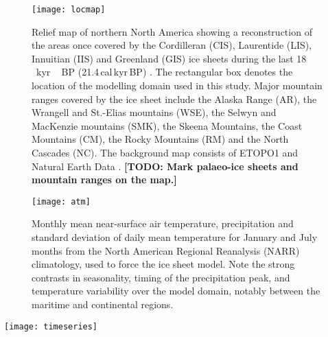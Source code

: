 \documentclass[tc, manuscript]{copernicus}
\newcommand{\todo}[1]{\textbf{[TODO: #1]}}
\begin{document}
\begin{figure}
  \texttt{[image: locmap]}
  \caption{Relief map of northern North America showing a reconstruction of the
           areas once covered by the Cordilleran (CIS), Laurentide (LIS),
           Innuitian (IIS) and Greenland (GIS) ice sheets during the last
           18\,\unit{\,kyr\,BP} (21.4\,cal\,kyr\,BP)
           \citep{Dyke.2004}. The rectangular box denotes the location of the
           modelling domain used in this study. Major mountain ranges covered
           by the ice sheet include the Alaska Range (AR), the Wrangell and
           St.-Elias mountains (WSE), the Selwyn and MacKenzie mountains (SMK),
           the Skeena Mountains, the Coast Mountains (CM), the Rocky Mountains
           (RM) and the North Cascades (NC). The background
           map consists of ETOPO1 \citep{Amante.Eakins.2009} and Natural Earth
           Data \citep{Patterson.Kelso.2014}.
           \todo{Mark palaeo-ice sheets and mountain ranges on the map.}}
  \label{fig:locmap}
\end{figure}

\begin{figure}
  \texttt{[image: atm]}
  \caption{Monthly mean near-surface air temperature, precipitation and
           standard deviation of daily mean temperature for January and July
           months from the North American Regional Reanalysis (NARR)
           climatology, used to force the ice sheet model. Note the
           strong contrasts in seasonality, timing of the precipitation peak,
           and temperature variability over the model domain, notably between
           the maritime and continental regions.}
  \label{fig:atm}
\end{figure}

\begin{figure*}
  \texttt{[image: timeseries]}
  \caption{Temperature offset time-series from ice core and sediment core
           records (Table~\ref{tab:records}) used as palaeo-climate forcing for
           the ice sheet model \textbf{(top)}, and modelled ice volume
           through the last 120\,kyr, expressed in meters of sea-level
           equivalent \textbf{(bottom)}. Gray spans indicate Marine Isotope
           Stages (MIS) according to a global compilation of benthic
            records \citep{Lisiecki.Raymo.2005}. Hatched
           rectangles highlight modelled ice volume extrema corresponding to
           MIS~4 (61.9--55.4\,kyr), MIS~3 (52.2--45.6\,kyr), and
           MIS~2 (last glacial maximum, 29.5--16.9\,kyr). Dotted lines
           correspond to the GRIP and EPICA 6\,km-resolution runs.
           \todo{add grid lines to improve readability}}
  \label{fig:timeseries}
\end{figure*}
\end{document}
